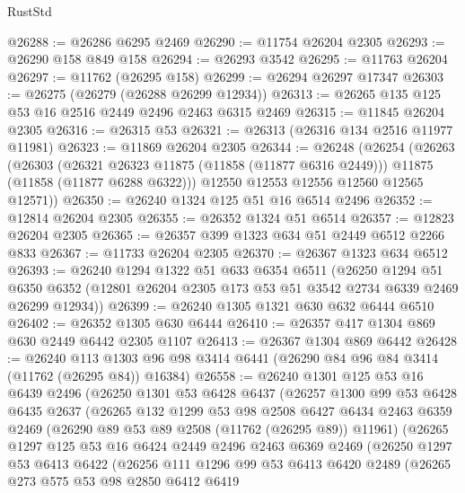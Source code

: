 \begin{lexlean}{RustStd}
\begin{coremodule}
@26288 := @26286 @6295 @2469
@26290 := @11754 @26204 @2305
@26293 := @26290 @158 @849 @158
@26294 := @26293 @3542
@26295 := @11763 @26204
@26297 := @11762 (@26295 @158)
@26299 := @26294 @26297 @17347
@26303 := @26275 (@26279 (@26288 @26299 @12934))
@26313 := @26265 @135 @125 @53 @16 @2516 @2449 @2496 @2463 @6315 @2469
@26315 := @11845 @26204 @2305
@26316 := @26315 @53
@26321 := @26313 (@26316 @134 @2516 @11977 @11981)
@26323 := @11869 @26204 @2305
@26344 := @26248
    (@26254
      (@26263
        (@26303
          (@26321 @26323 @11875 (@11858 (@11877 @6316 @2449)))
          @11875
          (@11858 (@11877 @6288 @6322)))
        @12550
        @12553
        @12556
        @12560
        @12565
        @12571))
@26350 := @26240 @1324 @125 @51 @16 @6514 @2496
@26352 := @12814 @26204 @2305
@26355 := @26352 @1324 @51 @6514
@26357 := @12823 @26204 @2305
@26365 := @26357 @399 @1323 @634 @51 @2449 @6512 @2266 @833
@26367 := @11733 @26204 @2305
@26370 := @26367 @1323 @634 @6512
@26393 := @26240
    @1294
    @1322
    @51
    @633
    @6354
    @6511
    (@26250
      @1294
      @51
      @6350
      @6352
      (@12801 @26204 @2305 @173 @53 @51 @3542 @2734 @6339 @2469 @26299 @12934))
@26399 := @26240 @1305 @1321 @630 @632 @6444 @6510
@26402 := @26352 @1305 @630 @6444
@26410 := @26357 @417 @1304 @869 @630 @2449 @6442 @2305 @1107
@26413 := @26367 @1304 @869 @6442
@26428 := @26240
    @113
    @1303
    @96
    @98
    @3414
    @6441
    (@26290 @84 @96 @84 @3414 (@11762 (@26295 @84)) @16384)
@26558 := @26240
    @1301
    @125
    @53
    @16
    @6439
    @2496
    (@26250
      @1301
      @53
      @6428
      @6437
      (@26257
        @1300
        @99
        @53
        @6428
        @6435
        @2637
        (@26265
          @132
          @1299
          @53
          @98
          @2508
          @6427
          @6434
          @2463
          @6359
          @2469
          (@26290 @89 @53 @89 @2508 (@11762 (@26295 @89)) @11961)
          (@26265
            @1297
            @125
            @53
            @16
            @6424
            @2449
            @2496
            @2463
            @6369
            @2469
            (@26250
              @1297
              @53
              @6413
              @6422
              (@26256
                @111
                @1296
                @99
                @53
                @6413
                @6420
                @2489
                (@26265
                  @273
                  @575
                  @53
                  @98
                  @2850
                  @6412
                  @6419

\end{coremodule}
\end{lexlean}
